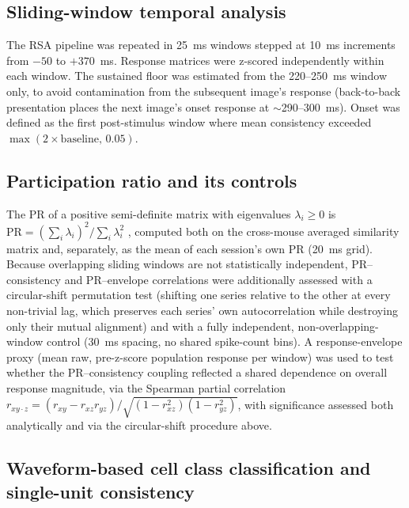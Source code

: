 \documentclass[11pt,onecolumn]{article}
\begin{document}
\subsection{Sliding-window temporal analysis}
\label{Methods:Sliding window}

The RSA pipeline was repeated in 25~ms windows stepped at 10~ms
increments from $-50$ to $+370$~ms. Response matrices were z-scored
independently within each window. The sustained floor was estimated from
the 220--250~ms window only, to avoid contamination from the subsequent
image's response (back-to-back presentation places the next image's onset
response at $\sim$290--300~ms). Onset was defined as the first
post-stimulus window where mean consistency exceeded
$\max(2 \times \text{baseline},\, 0.05)$.

\subsection{Participation ratio and its controls}
\label{Methods:PR}

The PR of a positive semi-definite matrix with eigenvalues
$\lambda_i \geq 0$ is $\mathrm{PR} = (\sum_i \lambda_i)^2 /
\sum_i \lambda_i^2$ \citep{gao2017}, computed both on the cross-mouse
averaged similarity matrix and, separately, as the mean of each session's
own PR (20~ms grid). Because overlapping sliding windows are not
statistically independent, PR--consistency and PR--envelope correlations
were additionally assessed with a circular-shift permutation test (shifting
one series relative to the other at every non-trivial lag, which preserves
each series' own autocorrelation while destroying only their mutual
alignment) and with a fully independent, non-overlapping-window control
(30~ms spacing, no shared spike-count bins). A response-envelope proxy
(mean raw, pre-z-score population response per window) was used to test
whether the PR--consistency coupling reflected a shared dependence on
overall response magnitude, via the Spearman partial correlation
$r_{xy \cdot z} = (r_{xy} - r_{xz} r_{yz}) /
\sqrt{(1 - r_{xz}^2)(1 - r_{yz}^2)}$, with significance assessed both
analytically and via the circular-shift procedure above.

\subsection{Waveform-based cell class classification and single-unit
consistency}
\label{Methods:RSU_FSU}
\end{document}
